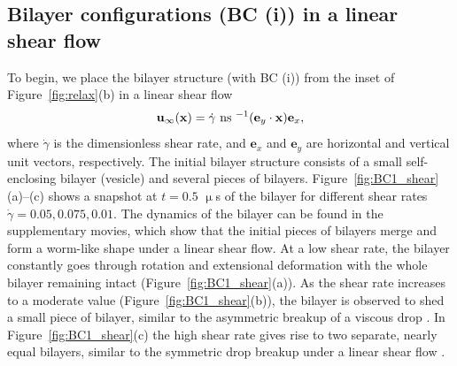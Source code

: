 \documentclass[prb,preprint,showpacs,preprintnumbers,amsmath,amssymb,longbibliography]{revtex4-1}
\newcommand{\ee}{\mathbf{e}}
\newcommand{\xx}{\mathbf{x}}
\newcommand{\uu}{\mathbf{u}}
\begin{document}
\subsection{Bilayer configurations (BC (i)) in a linear shear flow}
To begin, we place the bilayer structure (with BC (i)) from the inset of
Figure~\ref{fig:relax}(b) in a linear shear flow
\begin{equation}
\uu_\infty(\xx) = \dot\gamma \text{ ns }^{-1} ({\bf e}_y \cdot \mathbf{x}) {\bf e}_x,
\end{equation}
%
where $\dot\gamma$ is the dimensionless shear rate, and ${\ee}_x$ and
${\ee}_y$ are horizontal and vertical unit vectors, respectively. The
initial bilayer structure consists of a small self-enclosing bilayer
(vesicle) and several pieces of bilayers.
Figure~\ref{fig:BC1_shear}(a)--(c) shows a snapshot at $t = 0.5$
$\upmu$s of the bilayer for different shear rates $\dot\gamma=
0.05,0.075,0.01$. The dynamics of the bilayer can be found in the
supplementary movies, which show that the initial pieces of bilayers
merge and form a worm-like shape under a linear shear flow. At a low
shear rate, the bilayer constantly goes through rotation and extensional
deformation with the whole bilayer remaining intact
(Figure~\ref{fig:BC1_shear}(a)). As the shear rate increases to a
moderate value (Figure~\ref{fig:BC1_shear}(b)), the bilayer is observed
to shed a small piece of bilayer, similar to the asymmetric breakup of a
viscous drop \cite{} . In
Figure~\ref{fig:BC1_shear}(c) the high shear rate gives rise to two
separate, nearly equal bilayers, similar to the symmetric drop breakup
under a linear shear flow \cite{} .
\end{document}
